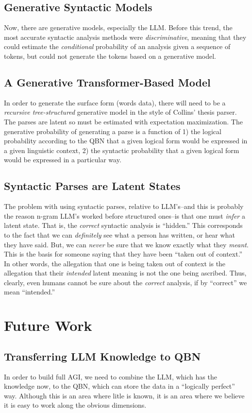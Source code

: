 \documentclass[12pt]{article}
\begin{document}
\subsection{Generative Syntactic Models}
Now, there are generative models, especially the LLM.
Before this trend, the most accurate syntactic analysis methods were {\em discriminative}, meaning that they could estimate the {\em conditional} probability of an analysis given a sequence of tokens, but could not generate the tokens based on a generative model.

\subsection{A Generative Transformer-Based Model}
In order to generate the surface form (words data), there will need to be a {\em recursive tree-structured} generative model in the style of Collins' thesis parser.
The parses are latent so must be estimated with expectation maximization.
The generative probability of generating a parse is a function of 1) the logical probability according to the QBN that a given logical form would be expressed in a given linguistic context, 2) the syntactic probability that a given logical form would be expressed in a particular way.

\subsection{Syntactic Parses are Latent States}
The problem with using syntactic parses, relative to LLM's--and this is probably the reason n-gram LLM's worked before structured ones--is that one must {\em infer} a latent state.
That is, the {\em correct} syntactic analysis is ``hidden.''
This corresponds to the fact that we can {\em definitely} see what a person has written, or hear what they have said.
But, we can {\em never} be sure that we know exactly what they {\em meant}.
This is the basis for someone saying that they have been ``taken out of context.''
In other words, the allegation that one is being taken out of context is the allegation that their {\em intended} latent meaning is not the one being ascribed.
Thus, clearly, even humans cannot be sure about the {\em correct} analysis, if by ``correct'' we mean ``intended.''


\section{Future Work}
\subsection{Transferring LLM Knowledge to QBN}
In order to build full AGI, we need to combine the LLM, which has the knowledge now, to the QBN, which can store the data in a ``logically perfect'' way.
Although this is an area where litle is known, it is an area where we believe it is easy to work along the obvious dimensions.
\end{document}
